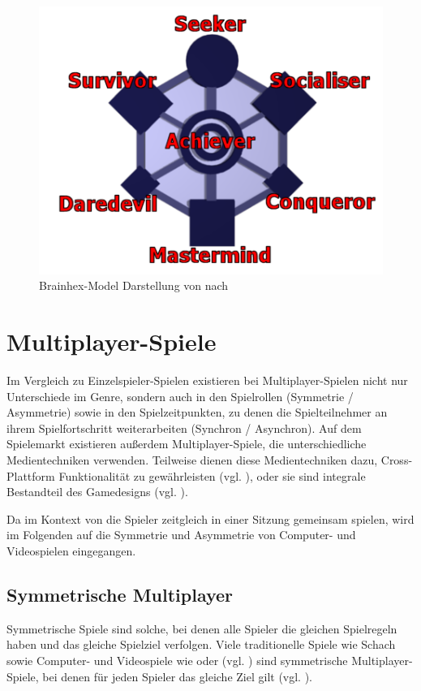 \begin{figure}[ht]
\centering
\includegraphics[width=1\linewidth]{content/pictures/brainhex-classes.png}
\caption{Brainhex-Model Darstellung von \citealp{noauthor_i_nodate} nach \citealp{nacke_brainhex_2013}}
\label{fig:brain-hex}
\end{figure}

\section{Multiplayer-Spiele}
Im Vergleich zu Einzelspieler-Spielen existieren bei Multiplayer-Spielen nicht nur Unterschiede im Genre, sondern auch in den Spielrollen (Symmetrie / Asymmetrie) sowie in den Spielzeitpunkten, zu denen die Spielteilnehmer an ihrem Spielfortschritt weiterarbeiten (Synchron / Asynchron). Auf dem Spielemarkt existieren außerdem Multiplayer-Spiele, die unterschiedliche Medientechniken verwenden. Teilweise dienen diese Medientechniken dazu, Cross-Plattform Funktionalität zu gewährleisten (vgl. \citealp{larian_studios_baldurs_2023}), oder sie sind integrale Bestandteil des Gamedesigns (vgl. \citealp{steel_crate_games_keep_2015}).

Da im Kontext von  die Spieler zeitgleich in einer Sitzung gemeinsam spielen, wird im Folgenden auf die Symmetrie und Asymmetrie von Computer- und Videospielen eingegangen.

\subsection{Symmetrische Multiplayer}
Symmetrische Spiele sind solche, bei denen alle Spieler die gleichen Spielregeln haben und das gleiche Spielziel verfolgen. Viele traditionelle Spiele wie Schach sowie Computer- und Videospiele wie  oder  (vgl. \citealp{nintendo_mario_1992, mojang_willkommen_2009}) sind symmetrische Multiplayer-Spiele, bei denen für jeden Spieler das gleiche Ziel gilt (vgl. \citealp[S. 12]{adams_fundamentals_2013}).

